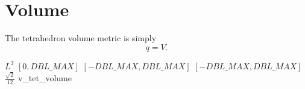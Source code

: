 \section{Volume}

The tetrahedron volume metric is simply
\[
q = V.
\]

%
{$L^3$}%
{$[0,DBL\_MAX]$}%
{$[-DBL\_MAX,DBL\_MAX]$}%
{$[-DBL\_MAX,DBL\_MAX]$}%
{$\frac { \sqrt{2}} {12}$}%
{\cite{par:93}}%
{v\_tet\_volume}%
